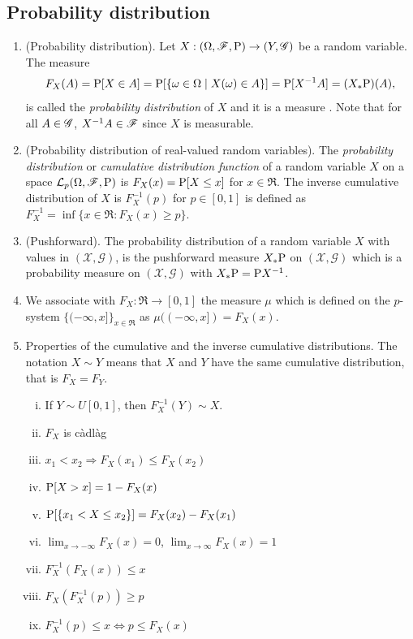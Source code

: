 \documentclass[a4paper,10pt]{article}
\begin{document}
\subsection{Probability distribution}
\begin{enumerate} 
 
 \item (Probability distribution). Let $X:(\Omega,\mathscr{F},\mathrm{P}) \to (Y, \mathscr{G})$ be a random variable. The measure
 \[
  F_X(A) = \mathrm{P}[X\in A] = \mathrm{P}[\{\omega\in\Omega\mid X(\omega) \in A\}] = \mathrm{P}[X^{-1}A] = (X_*\mathrm{P})(A),
 \]
 is called the \textit{probability distribution} of $X$ and it is a measure . Note that for all $A\in\mathscr{G}$, $X^{-1}A\in\mathscr{F}$
 since $X$ is measurable. 
 \item \label{rv221088}
 (Probability distribution of real-valued random variables).
 The \textit{probability distribution} or \textit{cumulative distribution function} of a random variable $X$ on a space
 $\mathcal{L}_p(\Omega,\mathscr{F},\mathrm{P})$ is $F_X(x) = \mathrm{P}[X\leq x]$ for $x\in\Re$. The inverse cumulative
 distribution of $X$ is $F_X^{-1}(p)$ for $p\in[0,1]$ is defined as 
 $F_X^{-1}=\inf\{x\in\Re: F_X(x) \geq p\}$. 
 
 \item (Pushforward).
 \label{rv221089}
 The probability distribution of a random variable $X$ with values in $(\mathcal{X},\mathscr{G})$,
 is the pushforward measure $X_*\mathrm{P}$ on $(\mathcal{X},\mathscr{G})$ which is 
 a probability measure on $(\mathcal{X},\mathscr{G})$ with $X_*\mathrm{P} = \mathrm{P} X^{-1}$.
 
 
 \item 
 \label{rv221137}
 We associate with $F_X:\Re\to[0,1]$ the measure $\mu$ which is defined on 
 the $p$-system $\{(-\infty,x]\}_{x\in\Re}$ as $\mu((-\infty, x]) = F_X(x)$.
 \item
 \label{rv231132}
 Properties of the cumulative and the inverse cumulative distributions. The notation
 $X\sim Y$ means that $X$ and $Y$ have the same cumulative distribution, that is 
 $F_X = F_Y$.
    \begin{enumerate}[i.]
      \item If $Y\sim U[0,1]$, then $F_X^{-1}(Y) \sim X$.
      \item $F_X$ is c\`adl\`ag
      \item $x_1<x_2 \Rightarrow F_X(x_1) \leq F_X(x_2)$
      \item $\mathrm{P}[X>x] = 1 - F_X(x)$
      \item $\mathrm{P}[\{x_1 < X \leq x_2\}] = F_X(x_2) - F_X(x_1)$
      \item $\lim_{x\to-\infty}F_X(x) = 0$, $\lim_{x\to\infty}F_X(x) = 1$
      \item $F_X^{-1}(F_X(x)) \leq x$
      \item $F_X(F_X^{-1}(p)) \geq p$
      \item $F_X^{-1}(p) \leq x \Leftrightarrow p \leq F_X(x)$
    \end{enumerate}
\end{enumerate}
\end{document}

